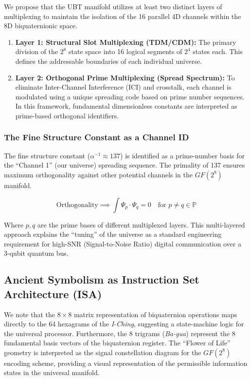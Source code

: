 We propose that the UBT manifold utilizes at least two distinct layers of multiplexing to maintain the isolation of the 16 parallel 4D channels within the 8D biquaternionic space.

\begin{enumerate}
    \item \textbf{Layer 1: Structural Slot Multiplexing (TDM/CDM):} 
    The primary division of the $2^8$ state space into 16 logical segments of $2^4$ states each. This defines the addressable boundaries of each individual universe.
    
    \item \textbf{Layer 2: Orthogonal Prime Multiplexing (Spread Spectrum):} 
    To eliminate Inter-Channel Interference (ICI) and crosstalk, each channel is modulated using a unique spreading code based on prime number sequences. In this framework, fundamental dimensionless constants are interpreted as prime-based orthogonal identifiers. 
\end{enumerate}

\subsubsection{The Fine Structure Constant as a Channel ID}

The fine structure constant ($\alpha^{-1} \approx 137$) is identified as a prime-number basis for the ``Channel 1'' (our universe) spreading sequence. The primality of 137 ensures maximum orthogonality against other potential channels in the $GF(2^8)$ manifold. 

\begin{equation}
\text{Orthogonality} \implies \int \Psi_p \cdot \Psi_q = 0 \quad \text{for } p \neq q \in \mathbb{P}
\end{equation}

Where $p, q$ are the prime bases of different multiplexed layers. This multi-layered approach explains the ``tuning'' of the universe as a standard engineering requirement for high-SNR (Signal-to-Noise Ratio) digital communication over a 3-qubit quantum bus.

\subsection{Ancient Symbolism as Instruction Set Architecture (ISA)}

We note that the $8 \times 8$ matrix representation of biquaternion operations maps directly to the 64 hexagrams of the \emph{I-Ching}, suggesting a state-machine logic for the universal processor. Furthermore, the 8 trigrams (\emph{Ba-gua}) represent the 8 fundamental basis vectors of the biquaternion register. The ``Flower of Life'' geometry is interpreted as the signal constellation diagram for the $GF(2^8)$ encoding scheme, providing a visual representation of the permissible information states in the universal manifold.

